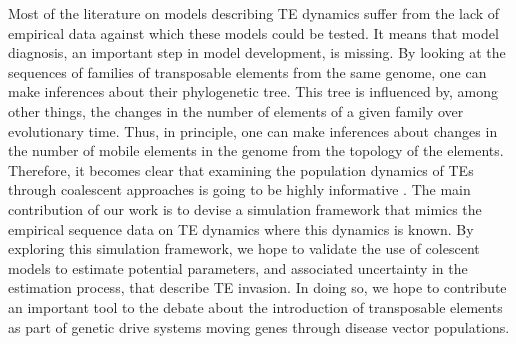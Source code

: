 \documentclass{bioinfo}
\begin{document}
Most of the literature on models describing TE dynamics suffer from
the lack of empirical data against which these models could be
tested. It means that model diagnosis, an important step in model
development, is missing. By looking at the sequences of families of
transposable elements from the same genome, one can make inferences
about their phylogenetic tree. This tree is influenced by, among other
things, the changes in the number of elements of a given family over
evolutionary time. Thus, in principle, one can make inferences about
changes in the number of mobile elements in the genome from the
topology of the elements. Therefore, it becomes clear that examining
the population dynamics of TEs through coalescent approaches is going
to be highly informative \citep{Bro05,BJ06,SMT+09}. The main
contribution of our work is to devise a simulation framework that
mimics the empirical sequence data on TE dynamics where this dynamics
is known. By exploring this simulation framework, we hope to validate
the use of colescent models to estimate potential parameters, and
associated uncertainty in the estimation process, that describe TE
invasion. In doing so, we hope to contribute an important tool to the
debate about the introduction of transposable elements as part of
genetic drive systems moving genes through disease vector populations.

\end{document}
